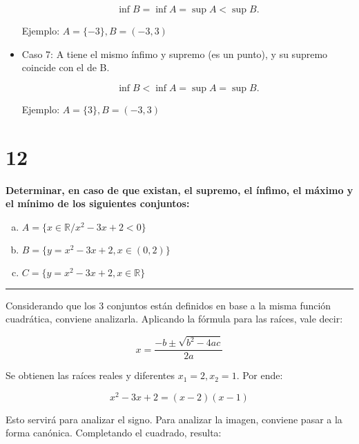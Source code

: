 \documentclass{article}
\newcommand{\sectionx}[1]{\section*{#1}\label{sec:#1}\addcontentsline{toc}{section}{\nameref{sec:#1}}}
\begin{document}
\begin{itemize}
\begin{equation}
\mathop{\text{inf}} B = \mathop{\text{inf}} A = \mathop{\text{sup}} A < \mathop{\text{sup}} B.
\end{equation}

Ejemplo: $ A = \{-3\}, B = (-3,3) $

\item Caso 7: A tiene el mismo ínfimo y supremo (es un punto), y su supremo coincide con el de B.

\begin{equation}
\mathop{\text{inf}} B < \mathop{\text{inf}} A = \mathop{\text{sup}} A = \mathop{\text{sup}} B.
\end{equation}

Ejemplo: $ A = \{3\}, B = (-3,3) $

\end{itemize}

\sectionx{12}

\textbf{Determinar, en caso de que existan, el supremo, el ínfimo, el máximo y el mínimo de los siguientes conjuntos:}

\begin{enumerate}[(a)]

\item $ A = \{ x \in \mathbb{R} / x^2 - 3x + 2 < 0 \} $

\item $ B = \{ y = x^2 - 3x + 2, x \in (0, 2) \} $

\item $ C = \{ y = x^2 - 3x + 2, x \in \mathbb{R} \} $

\end{enumerate}

\hrule
\vspace{1em}

Considerando que los 3 conjuntos están definidos en base a la misma función cuadrática, conviene analizarla. Aplicando la fórmula para las raíces, vale decir:

\begin{equation}
x = \frac{-b \pm \sqrt{b^2-4ac}}{2a}
\end{equation}

Se obtienen las raíces reales y diferentes $ x_1 = 2, x_2 = 1 $. Por ende:

\begin{equation}
x^2 - 3x + 2 = (x-2) (x-1)
\end{equation}

Esto servirá para analizar el signo. Para analizar la imagen, conviene pasar a la forma canónica. Completando el cuadrado, resulta:
\end{document}
